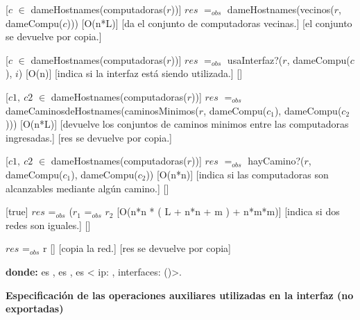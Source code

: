 \begin{Interfaz}
  [$c$ $\in$ dameHostnames(computadoras($r$))]
  {$res$ $=_{obs}$ dameHostnames(vecinos($r$, dameCompu($c$)))}
  [O(n*L)]
  [da el conjunto de computadoras vecinas.]
  [el conjunto se devuelve por copia.]

  [$c$ $\in$ dameHostnames(computadoras($r$))]
  {$res$ $=_{obs}$ usaInterfaz?($r$, dameCompu($c$), $i$)}
  [O(n)]
  [indica si la interfaz est\'a siendo utilizada.]
  []

  [$c1,\ c2$ $\in$ dameHostnames(computadoras($r$))]
  {$res$ $=_{obs}$ dameCaminosdeHostnames(caminosMinimos($r$, dameCompu($c_1$), dameCompu($c_2$)))}
  [O(n*L)]
  [devuelve los conjuntos de caminos minimos entre las computadoras ingresadas.]
  [res se devuelve por copia.]
  
  [$c1,\ c2$ $\in$ dameHostnames(computadoras($r$))]
  {$res$ $=_{obs}$ hayCamino?($r$, dameCompu($c_1$), dameCompu($c_2$))}
  [O(n*n)]
  [indica si las computadoras son alcanzables mediante alg\'un camino.]
  []
  
  [true]
  {$res$ =$_{obs}$ ($r_1$ =$_{obs}$ $r_2$}%
  [O(n*n * ( L + n*n + m ) + n*m*m)]
  [indica si dos redes son iguales.]
  [] 
  
  {$res$ =$_{obs}$ r}
  []
  [copia la red.]
  [res se devuelve por copia]
  
   \textbf{donde:} \newline 
    es , \newline
    es , \newline
    es < ip: , interfaces: ()>.
   
\end{Interfaz}

\textbf{} %

\textbf{Especificaci\'on de las operaciones auxiliares utilizadas en la interfaz (no exportadas)}

